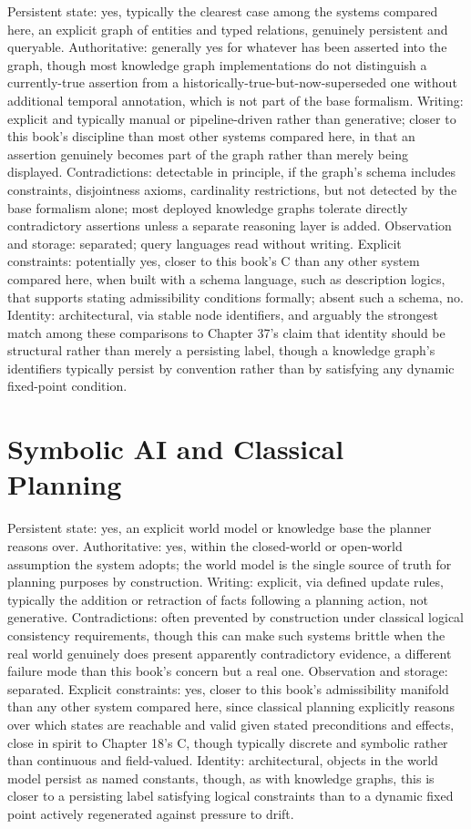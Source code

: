 Persistent state: yes, typically the clearest case among the systems compared here, an explicit graph of entities and typed relations, genuinely persistent and queryable. Authoritative: generally yes for whatever has been asserted into the graph, though most knowledge graph implementations do not distinguish a currently-true assertion from a historically-true-but-now-superseded one without additional temporal annotation, which is not part of the base formalism. Writing: explicit and typically manual or pipeline-driven rather than generative; closer to this book's discipline than most other systems compared here, in that an assertion genuinely becomes part of the graph rather than merely being displayed. Contradictions: detectable in principle, if the graph's schema includes constraints, disjointness axioms, cardinality restrictions, but not detected by the base formalism alone; most deployed knowledge graphs tolerate directly contradictory assertions unless a separate reasoning layer is added. Observation and storage: separated; query languages read without writing. Explicit constraints: potentially yes, closer to this book's C than any other system compared here, when built with a schema language, such as description logics, that supports stating admissibility conditions formally; absent such a schema, no. Identity: architectural, via stable node identifiers, and arguably the strongest match among these comparisons to Chapter 37's claim that identity should be structural rather than merely a persisting label, though a knowledge graph's identifiers typically persist by convention rather than by satisfying any dynamic fixed-point condition.

\section{Symbolic AI and Classical Planning}

Persistent state: yes, an explicit world model or knowledge base the planner reasons over. Authoritative: yes, within the closed-world or open-world assumption the system adopts; the world model is the single source of truth for planning purposes by construction. Writing: explicit, via defined update rules, typically the addition or retraction of facts following a planning action, not generative. Contradictions: often prevented by construction under classical logical consistency requirements, though this can make such systems brittle when the real world genuinely does present apparently contradictory evidence, a different failure mode than this book's concern but a real one. Observation and storage: separated. Explicit constraints: yes, closer to this book's admissibility manifold than any other system compared here, since classical planning explicitly reasons over which states are reachable and valid given stated preconditions and effects, close in spirit to Chapter 18's C, though typically discrete and symbolic rather than continuous and field-valued. Identity: architectural, objects in the world model persist as named constants, though, as with knowledge graphs, this is closer to a persisting label satisfying logical constraints than to a dynamic fixed point actively regenerated against pressure to drift.

